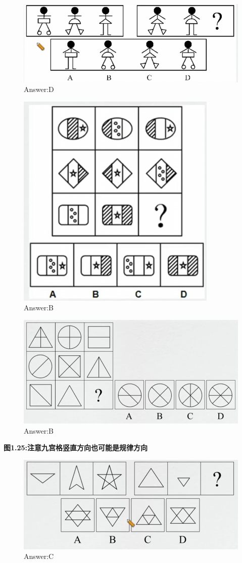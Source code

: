 \documentclass{article}
\numberwithin{equation}{section}						%
\numberwithin{figure}{section}							%
\begin{document}
\begin{sloppypar}
\begin{figure}[H]
     \centering
     \includegraphics[width=0.6\linewidth]{26.png}
		\caption{Answer:D}
\end{figure}


\begin{figure}[H]
     \centering
     \includegraphics[width=0.35\linewidth]{27.png}
		\caption{Answer:B}
\end{figure}


\begin{figure}[H]
     \centering
     \includegraphics[width=0.5\linewidth]{28.png}
		\caption{Answer:B}
\end{figure}

\textbf{图1.25:注意九宫格竖直方向也可能是规律方向}

\begin{figure}[H]
     \centering
     \includegraphics[width=0.5\linewidth]{29.png}
		\caption{Answer:C}
\end{figure}



\end{sloppypar}
\end{document}
